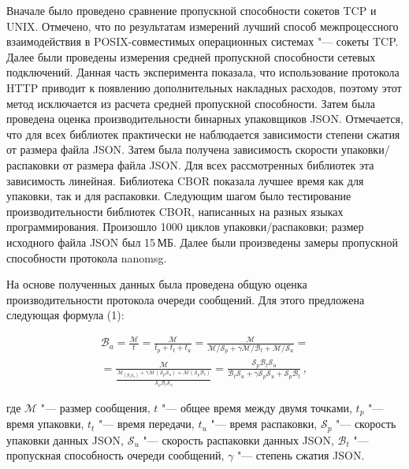 Вначале было проведено сравнение пропускной способности сокетов TCP и UNIX. Отмечено, что по результатам измерений лучший способ межпроцессного взаимодействия в POSIX-совместимых операционных системах "--- сокеты TCP. Далее были проведены измерения средней пропускной способности сетевых подключений. Данная часть эксперимента показала, что использование протокола HTTP приводит к появлению дополнительных накладных расходов, поэтому этот метод исключается из расчета средней пропускной способности. Затем была проведена оценка производительности бинарных упаковщиков JSON. Отмечается, что для всех библиотек практически не наблюдается зависимости степени сжатия от размера файла JSON. Затем была получена зависимость скорости упаковки/распаковки от размера файла JSON. Для всех рассмотренных библиотек эта зависимость линейная. Библиотека CBOR показала лучшее время как для упаковки, так и для распаковки.
Следующим шагом было тестирование производительности библиотек CBOR, написанных на разных языках программирования. Произошло 1000 циклов упаковки/распаковки; размер исходного файла JSON был 15\,МБ. Далее были произведены замеры пропускной способности протокола nanomsg. 

На основе полученных данных была проведена общую оценка производительности протокола очереди сообщений. Для этого предложена следующая формула (1): 

\begin{equation}
\begin{split}
\label{eq:example}
\mathcal{B}_a = \frac{\mathcal{M}}{t}
= \frac{\mathcal{M}}{t_p + t_t + t_u}
= \frac{\mathcal{M}}
{\mathcal{M} / \mathcal{S}_p + 
	\gamma\mathcal{M} / \mathcal{B}_t + 
	\mathcal{M} / \mathcal{S}_u} = \\
= \frac{\mathcal{M}}
{\frac{\mathcal{M}_(\mathcal{B}_t\mathcal{S}_u) +
		\gamma
		\mathcal{M}(\mathcal{S}_p\mathcal{S}_u) +
		\mathcal{M}(\mathcal{S}_p\mathcal{B}_t)} 
	{\mathcal{S}_p\mathcal{B}_t\mathcal{S}_u}
}
=\frac{\mathcal{S}_p\mathcal{B}_t\mathcal{S}_u}
{\mathcal{B}_t\mathcal{S}_u + \gamma\mathcal{S}_p\mathcal{S}_u + \mathcal{S}_p\mathcal{B}_t}\,,
\end{split}
\end{equation}

\noindent где ${\mathcal{M}}$ "--- размер сообщения, $t$ "--- общее время между двумя точками, $t_p$ "--- время упаковки, $t_t$ "--- время передачи, $t_u$ "--- время распаковки, $\mathcal{S}_p$ "--- скорость упаковки данных JSON, $\mathcal{S}_u$ "--- скорость распаковки данных JSON, $\mathcal{B}_t$ "--- пропускная способность очереди сообщений, $\gamma$ "--- степень сжатия JSON.


